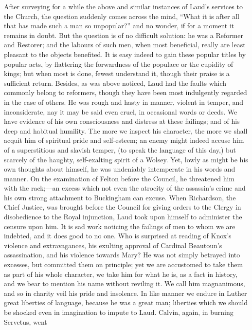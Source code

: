 After surveying for a while the above and similar
instances of Laud's services to the Church, the question suddenly comes
across the mind, ``What it is after all that has made such a man so
unpopular?'' and no wonder, if for a moment it remains in doubt. But the
question is of no difficult solution: he was a Reformer and Restorer;
and the labours of such men, when most beneficial, really are least
pleasant to the objects benefited. It is easy indeed to gain these
popular titles by popular acts, by flattering the forwardness of the
populace or the cupidity of kings; but when most is done, fewest
understand it, though their praise is a sufficient return. Besides, as
was above noticed, Laud had the faults which commonly belong to
reformers, though they have been most indulgently regarded in the case
of others. He was rough and hasty in manner, violent in temper, and
inconsiderate, nay it may be said even cruel, in occasional words or
deeds. We have evidence of his own consciousness and distress at
these failings; and of his deep and habitual humility. The more we
inspect his character, the more we shall acquit him of spiritual pride
and self-esteem; an enemy might indeed accuse him of a superstitious and
slavish temper, (to speak the language of this day,) but scarcely of the
haughty, self-exalting spirit of a Wolsey. Yet, lowly as might be his
own thoughts about himself, he was undeniably intemperate in his words
and manner. On the examination of Felton before the Council, he
threatened him with the rack;—an excess which not even the atrocity of
the assassin's crime and his own strong attachment to Buckingham can
excuse. When Richardson, the Chief Justice, was brought before the
Council for giving orders to the Clergy in disobedience to the Royal
injunction, Laud took upon himself to administer the censure upon him.
It is sad work noticing the failings of men to whom we are indebted, and
it does good to no one. Who is surprised at reading of Knox's violence
and extravagances, his exulting approval of Cardinal Beautoun's
assassination, and his violence towards Mary? He was not simply betrayed
into excesses, but committed them on principle; yet we are accustomed to
take them as part of his whole character, we take him for what he is, as
a fact in history, and we bear to mention his name without reviling it.
We call him magnanimous, and so in charity veil his pride and insolence.
In like manner we endure in Luther great liberties of language, because
he was a great man; liberties which we should be shocked even in
imagination to impute to Laud. Calvin, again, in burning Servetus, went
